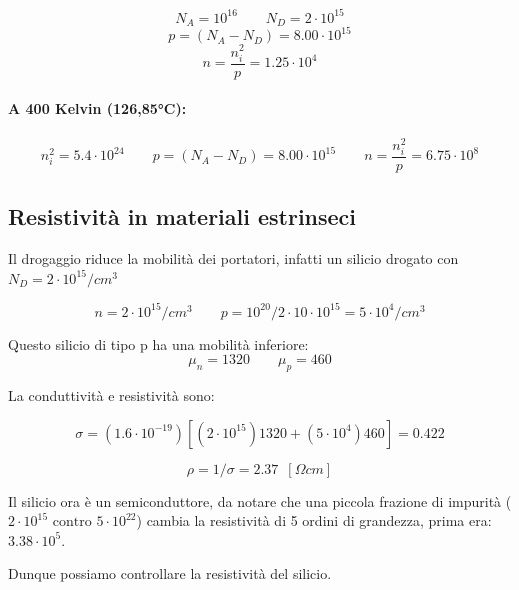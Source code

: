 \begin{equation*}
    N_A = 10^{16} \qquad N_D = 2\cdot10^{15}
\end{equation*}
\begin{equation*}
   p = (N_A - N_D) = 8.00 \cdot 10^{15}
\end{equation*}
\begin{equation*}
   n = \frac{n_i^2}{p} = 1.25 \cdot 10^{4}
\end{equation*}

\paragraph{A 400 Kelvin (126,85°C):}
\begin{equation*}
   n_i^2 = 5.4 \cdot10^{24} \qquad p = (N_A - N_D) = 8.00\cdot10^{15} \qquad n = \frac{n_i^2}{p} = 6.75 \cdot 10^{8}
\end{equation*}


\subsection{Resistività in materiali estrinseci}
Il	drogaggio	riduce	la	mobilità	dei	portatori, infatti un silicio drogato con $N_D = 2\cdot10^{15}/cm^3$

\begin{equation*}
    n = 2\cdot10^{15}/cm^3 \qquad p = 10^{20}/2\cdot10\cdot10^{15} = 5\cdot10^{4}/cm^3
\end{equation*}

Questo silicio di tipo p ha una mobilità inferiore:
\begin{equation*}
    \mu_n = 1320\qquad\mu_p = 460
\end{equation*}

La conduttività e resistività sono:

\begin{equation*}
    \sigma = (1.6\cdot10^{-19})[(2\cdot10^{15})1320 + (5\cdot10^4)460] = 0.422
\end{equation*}

\begin{equation*}
    \rho = 1/\sigma = 2.37\,\,\,[\Omega cm]
\end{equation*}

Il silicio ora è un semiconduttore, da notare che una piccola frazione di impurità ($2\cdot10^{15} \text{ contro } 5\cdot10^{22}$) cambia la resistività di 5 ordini di grandezza, prima era: $3.38\cdot10^{5}$.

Dunque possiamo controllare la resistività del silicio.

